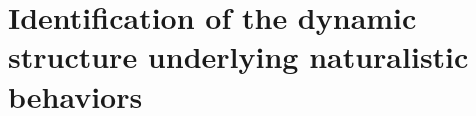 
\chapter{Identification of the dynamic structure underlying naturalistic behaviors\label{ch:slds}}





